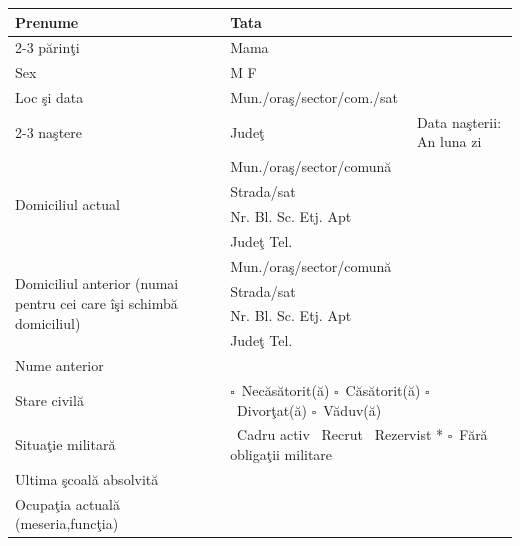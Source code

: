 \documentclass[11pt,a4paper]{article}
\newcommand{\fillline}[1][6cm]{\underline{\hspace{#1}}}
\newcommand{\fillbox}[1][0.4cm]{\framebox[#1]{\rule{0pt}{#1}}}
\newcommand{\checkboxempty}{$\square$}
\begin{document}
\begin{tabularx}{\textwidth}{|m{2.6cm}|m{3cm}|X|}
\hline
Prenume & Tata & \\
\cline{2-3}
părinţi & Mama & \\
\hline
Sex & \multicolumn{2}{l|}{\hspace{2cm} M \fillbox \hspace{4cm} F \fillbox} \\
\hline
Loc şi data & Mun./oraş/sector/com./sat & \\
\cline{2-3}
naştere & Judeţ & Data naşterii: An \fillbox\fillbox\fillbox\fillbox \quad luna \fillbox\fillbox \quad zi \fillbox\fillbox \\
\hline
\multirow{4}{2.6cm}{Domiciliul actual} & \multicolumn{2}{l|}{Mun./oraş/sector/comună \hspace{1cm} \fillline[10cm]} \\
\cline{2-3}
 & \multicolumn{2}{l|}{Strada/sat \hspace{1cm} \fillline[12cm]} \\
\cline{2-3}
 & \multicolumn{2}{l|}{Nr. \fillline[1cm] Bl. \fillline[1cm] Sc. \fillline[1cm] Etj. \fillline[1cm] Apt \fillline[1.5cm]} \\
\cline{2-3}
 & \multicolumn{2}{l|}{Judeţ \fillline[5cm] \hfill Tel. \fillline[4cm]} \\
\hline
\multirow{4}{2.6cm}{\footnotesize Domiciliul anterior (numai pentru cei care îşi schimbă domiciliul)} & \multicolumn{2}{l|}{Mun./oraş/sector/comună \hspace{1cm} \fillline[10cm]} \\
\cline{2-3}
 & \multicolumn{2}{l|}{Strada/sat \hspace{1cm} \fillline[12cm]} \\
\cline{2-3}
 & \multicolumn{2}{l|}{Nr. \fillline[1cm] Bl. \fillline[1cm] Sc. \fillline[1cm] Etj. \fillline[1cm] Apt \fillline[1.5cm]} \\
\cline{2-3}
 & \multicolumn{2}{l|}{Judeţ \fillline[5cm] \hfill Tel. \fillline[4cm]} \\
\hline
Nume anterior & \multicolumn{2}{l|}{\fillline[12cm]} \\
\hline
Stare civilă & \multicolumn{2}{l|}{\checkboxempty\ Necăsătorit(ă) \quad \checkboxempty\ Căsătorit(ă) \quad \checkboxempty\ Divorţat(ă) \quad \checkboxempty\ Văduv(ă)} \\
\hline
Situaţie militară & \multicolumn{2}{l|}{\fillbox\ Cadru activ \quad \fillbox\ Recrut \quad \fillbox\ Rezervist * \quad \checkboxempty\ Fără obligaţii militare} \\
\hline
Ultima şcoală absolvită & \multicolumn{2}{l|}{\fillline[12cm]} \\
\hline
Ocupaţia actuală (meseria,funcţia) & \multicolumn{2}{l|}{\fillline[12cm]} \\
\hline
\end{tabularx}
\end{document}
